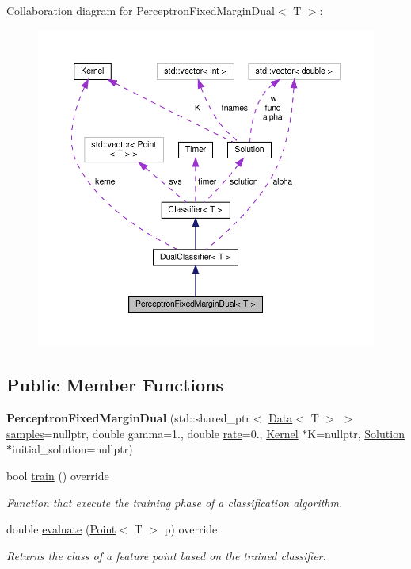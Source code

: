 Collaboration diagram for Perceptron\+Fixed\+Margin\+Dual$<$ T $>$\+:
\nopagebreak
\begin{figure}[H]
\begin{center}
\leavevmode
\includegraphics[width=350pt]{class_perceptron_fixed_margin_dual__coll__graph}
\end{center}
\end{figure}
\subsection*{Public Member Functions}
\begin{DoxyCompactItemize}
\item 
{\bfseries Perceptron\+Fixed\+Margin\+Dual} (std\+::shared\+\_\+ptr$<$ \hyperlink{class_data}{Data}$<$ T $>$ $>$ \hyperlink{class_classifier_a0000b47a2e0784ada4c52d7046c4adb8}{samples}=nullptr, double gamma=1., double \hyperlink{class_classifier_a7b1c4ef87631bd9e46682e5bc4315111}{rate}=0., \hyperlink{class_kernel}{Kernel} $\ast$K=nullptr, \hyperlink{class_solution}{Solution} $\ast$initial\+\_\+solution=nullptr)\hypertarget{class_perceptron_fixed_margin_dual_ac1397a3a17a88769befdf64f83573895}{}\label{class_perceptron_fixed_margin_dual_ac1397a3a17a88769befdf64f83573895}

\item 
bool \hyperlink{class_perceptron_fixed_margin_dual_a58a5acdd6afaedff53fab23779f01486}{train} () override
\begin{DoxyCompactList}\small\item\em Function that execute the training phase of a classification algorithm. \end{DoxyCompactList}\item 
double \hyperlink{class_perceptron_fixed_margin_dual_acafabadf6d2552fde0bfb32f0344c6e3}{evaluate} (\hyperlink{class_point}{Point}$<$ T $>$ p) override
\begin{DoxyCompactList}\small\item\em Returns the class of a feature point based on the trained classifier. \end{DoxyCompactList}\end{DoxyCompactItemize}

